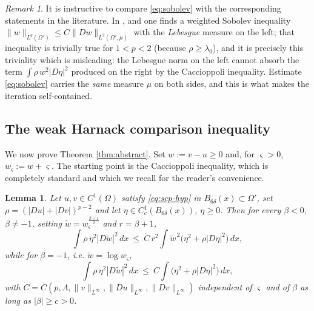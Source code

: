 \documentclass[reqno]{amsart}
\theoremstyle{plain}
\newtheorem{lemma}[theorem]{Lemma}
\theoremstyle{definition}
\theoremstyle{remark}
\newtheorem{remark}[theorem]{Remark}
\begin{document}
\begin{remark}
It is instructive to compare \eqref{eq:sobolev} with the corresponding statements in the
literature. In \cite[Theorem 2.2]{DS2}, \cite[Theorem 4.1]{Sci2} and \cite[Theorem 2.2]{MMS} one
finds a weighted Sobolev inequality $\|w\|_{L^{q}(\Omega')}\le C\|Dw\|_{L^2(\Omega',\mu)}$ with the
\emph{Lebesgue} measure on the left; that inequality is trivially true for $1<p<2$ (because
$\rho\ge\lambda_0$), and it is precisely this triviality which is misleading: the Lebesgue norm on
the left cannot absorb the term $\int\rho\,w^2|D\eta|^2$ produced on the right by the Caccioppoli
inequality. Estimate \eqref{eq:sobolev} carries the \emph{same} measure $\mu$ on both sides, and this
is what makes the iteration self-contained.
\end{remark}

\subsection{The weak Harnack comparison inequality}

We now prove Theorem \ref{thm:abstract}. Set $w:=v-u\ge0$ and, for $\varsigma>0$,
$w_\varsigma:=w+\varsigma$. The starting point is the Caccioppoli inequality, which is completely
standard and which we recall for the reader's convenience.

\begin{lemma}\label{lem:cacc-comp}
Let $u,v\in C^1(\Omega)$ satisfy \eqref{eq:scp-hyp} in $B_{6\delta}(x)\subset\Omega'$, set
$\rho=(|Du|+|Dv|)^{p-2}$ and let $\eta\in C_c^1(B_{6\delta}(x))$, $\eta\ge0$. Then for every $\beta<0$,
$\beta\ne-1$, setting $\widetilde w=w_\varsigma^{\frac{\beta+1}{2}}$ and $r=\beta+1$,
\begin{equation}\label{eq:cacc-comp}
\int\rho\,\eta^2|D\widetilde w|^2\,dx\ \le\ \dot C\,r^2\int \widetilde w^{\,2}\big(\eta^2+\rho|D\eta|^2\big)\,dx ,
\end{equation}
while for $\beta=-1$, i.e. $\widetilde w=\log w_\varsigma$,
\begin{equation}\label{eq:cacc-log}
\int\rho\,\eta^2|D\widetilde w|^2\,dx\ \le\ \dot C\int\big(\eta^2+\rho|D\eta|^2\big)\,dx ,
\end{equation}
with $\dot C=\dot C(p,\Lambda,\|v\|_{L^\infty},\|Du\|_{L^\infty},\|Dv\|_{L^\infty})$ independent of
$\varsigma$ and of $\beta$ as long as $|\beta|\ge c>0$.
\end{lemma}
\end{document}
